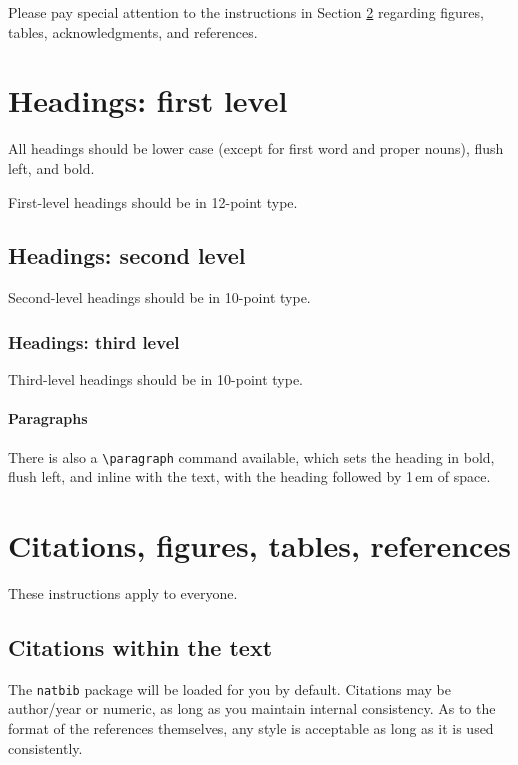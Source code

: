 \documentclass{article}
\begin{document}
Please pay special attention to the instructions in Section \ref{others}
regarding figures, tables, acknowledgments, and references.


\section{Headings: first level}
\label{headings}


All headings should be lower case (except for first word and proper nouns),
flush left, and bold.


First-level headings should be in 12-point type.


\subsection{Headings: second level}


Second-level headings should be in 10-point type.


\subsubsection{Headings: third level}


Third-level headings should be in 10-point type.


\paragraph{Paragraphs}


There is also a \verb+\paragraph+ command available, which sets the heading in
bold, flush left, and inline with the text, with the heading followed by 1\,em
of space.


\section{Citations, figures, tables, references}
\label{others}


These instructions apply to everyone.


\subsection{Citations within the text}


The \verb+natbib+ package will be loaded for you by default.  Citations may be
author/year or numeric, as long as you maintain internal consistency.  As to the
format of the references themselves, any style is acceptable as long as it is
used consistently.
\end{document}
